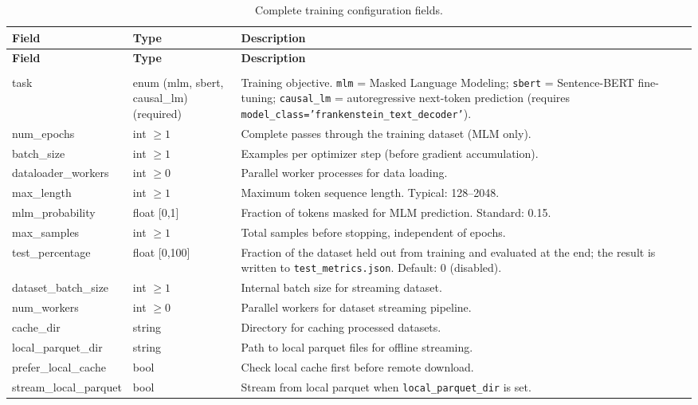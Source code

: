 \begin{longtable}{>{\ttfamily\footnotesize\raggedright\arraybackslash}p{5.6cm}>{\raggedright\arraybackslash}p{2.4cm}>{\raggedright\arraybackslash}p{6.9cm}}
\toprule
\textbf{Field} & \textbf{Type} & \textbf{Description} \\
\midrule
\endfirsthead
\toprule
\textbf{Field} & \textbf{Type} & \textbf{Description} \\
\midrule
\endhead
\midrule
\multicolumn{3}{r}{\textit{continued on next page}} \\
\endfoot
\bottomrule
\caption{Complete training configuration fields.}
\label{tab:training-fields}
\endlastfoot
task & enum (mlm, sbert, causal\_lm) (required) & Training objective. \texttt{mlm} = Masked Language Modeling; \texttt{sbert} = Sentence-BERT fine-tuning; \texttt{causal\_lm} = autoregressive next-token prediction (requires \texttt{model\_class='frankenstein\_text\_decoder'}). \\
num\_epochs & int $\ge 1$ & Complete passes through the training dataset (MLM only). \\
batch\_size & int $\ge 1$ & Examples per optimizer step (before gradient accumulation). \\
dataloader\_workers & int $\ge 0$ & Parallel worker processes for data loading. \\
max\_length & int $\ge 1$ & Maximum token sequence length. Typical: 128--2048. \\
mlm\_probability & float [0,1] & Fraction of tokens masked for MLM prediction. Standard: 0.15. \\
max\_samples & int $\ge 1$ & Total samples before stopping, independent of epochs. \\
test\_percentage & float [0,100] & Fraction of the dataset held out from training and evaluated at the end; the result is written to \texttt{test\_metrics.json}. Default: 0 (disabled). \\
dataset\_batch\_size & int $\ge 1$ & Internal batch size for streaming dataset. \\
num\_workers & int $\ge 0$ & Parallel workers for dataset streaming pipeline. \\
cache\_dir & string & Directory for caching processed datasets. \\
local\_parquet\_dir & string & Path to local parquet files for offline streaming. \\
prefer\_local\_cache & bool & Check local cache first before remote download. \\
stream\_local\_parquet & bool & Stream from local parquet when \texttt{local\_parquet\_dir} is set. \\

\end{longtable}
